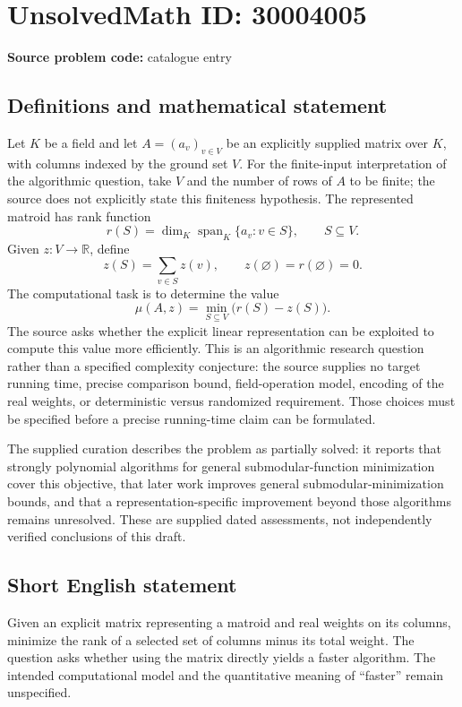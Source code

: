 \documentclass[11pt]{article}
\newcommand{\R}{\mathbb{R}}
\begin{document}
\section*{UnsolvedMath ID: 30004005}
\textbf{Source problem code:} catalogue entry
\subsection{Definitions and mathematical statement}
Let \(K\) be a field and let \(A=(a_v)_{v\in V}\) be an explicitly supplied matrix over \(K\), with columns indexed by the ground set \(V\). For the finite-input interpretation of the algorithmic question, take \(V\) and the number of rows of \(A\) to be finite; the source does not explicitly state this finiteness hypothesis. The represented matroid has rank function
\[
r(S)=\dim_K\operatorname{span}_K\{a_v:v\in S\},\qquad S\subseteq V.
\]
Given \(z:V\to\R\), define
\[
z(S)=\sum_{v\in S}z(v),\qquad z(\varnothing)=r(\varnothing)=0.
\]
The computational task is to determine the value
\[
\mu(A,z)=\min_{S\subseteq V}\bigl(r(S)-z(S)\bigr).
\]
The source asks whether the explicit linear representation can be exploited to compute this value more efficiently. This is an algorithmic research question rather than a specified complexity conjecture: the source supplies no target running time, precise comparison bound, field-operation model, encoding of the real weights, or deterministic versus randomized requirement. Those choices must be specified before a precise running-time claim can be formulated.

The supplied curation describes the problem as partially solved: it reports that strongly polynomial algorithms for general submodular-function minimization cover this objective, that later work improves general submodular-minimization bounds, and that a representation-specific improvement beyond those algorithms remains unresolved. These are supplied dated assessments, not independently verified conclusions of this draft.
\subsection{Short English statement}
Given an explicit matrix representing a matroid and real weights on its columns, minimize the rank of a selected set of columns minus its total weight. The question asks whether using the matrix directly yields a faster algorithm. The intended computational model and the quantitative meaning of ``faster'' remain unspecified.
\end{document}
